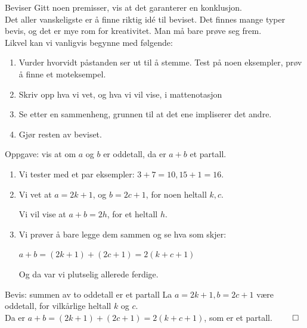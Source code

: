 

\begin{frame}{Beviser}
    Gitt noen premisser, vis at det garanterer en konklusjon.\\

    Det aller vanskeligste er å finne riktig idé til beviset. Det finnes mange typer bevis, og det er mye rom for kreativitet. Man må bare prøve seg frem.\\
    
    Likvel kan vi vanligvis begynne med følgende:
    \begin{enumerate}
        \item Vurder hvorvidt påstanden ser ut til å stemme. Test på noen eksempler, prøv å finne et moteksempel.
        \pause
        \item Skriv opp hva vi vet, og hva vi vil vise, i mattenotasjon
        \pause
        \item Se etter en sammenheng, grunnen til at det ene impliserer det andre.
        \pause
        \item Gjør resten av beviset.
    \end{enumerate}
\end{frame}

\begin{frame}{Oppgave: vis at om $a$ og $b$ er oddetall, da er $a + b$ et partall.}
    \begin{enumerate}
        \item Vi tester med et par eksempler: $3+7 = 10, 15+1 = 16$.
        \pause
        \item Vi vet at $a = 2k + 1$, og $b = 2c + 1$, for noen heltall $k, c$. 
        
        Vi vil vise at $a + b = 2h$, for et heltall $h$.
        \pause
        \item Vi prøver å bare legge dem sammen og se hva som skjer:
        
        $a + b = (2k + 1) + (2c + 1) = 2(k + c + 1)$

        Og da var vi plutselig allerede ferdige.
    \end{enumerate}

    \begin{block}{Bevis: summen av to oddetall er et partall}
        La $a = 2k + 1, b = 2c + 1$ være oddetall, for vilkårlige heltall $k$ og $c$.\\
        Da er $a + b = (2k + 1) + (2c + 1) = 2(k + c + 1)$, som er et partall. $\qed$
    \end{block}
\end{frame}


